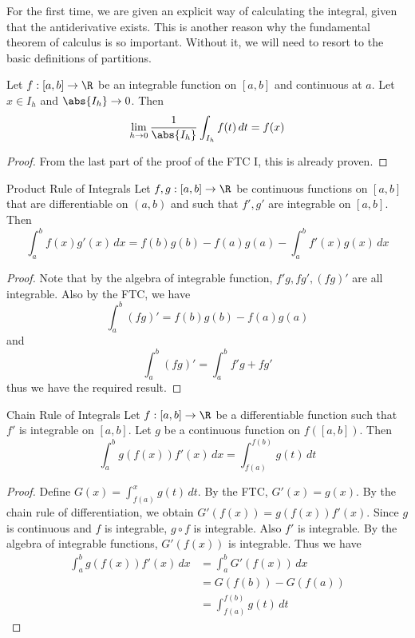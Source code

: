 For the first time, we are given an explicit way of calculating the integral, given that the antiderivative exists. This is another reason why the fundamental theorem of calculus is so important. Without it, we will need to resort to the basic definitions of partitions. 

\begin{thm}{}{} Let $f:[a,b]\to\R$ be an integrable function on $[a,b]$ and continuous at $a$. Let $x\in I_h$ and $\abs{I_h}\to 0$. Then $$\lim_{h\to 0}\frac{1}{\abs{I_h}}\int_{I_h}f(t)\,dt=f(x)$$ \tcbline
\begin{proof} From the last part of the proof of the FTC I, this is already proven. 
\end{proof}
\end{thm}

\begin{thm}{Product Rule of Integrals}{} Let $f,g:[a,b]\to\R$ be continuous functions on $[a,b]$ that are differentiable on $(a,b)$ and such that $f',g'$ are integrable on $[a,b]$. Then $$\int_{a}^{b}f(x)g'(x)\,dx=f(b)g(b)-f(a)g(a)-\int_{a}^{b}f'(x)g(x)\,dx$$ \tcbline
\begin{proof} Note that by the algebra of integrable function, $f'g,fg',(fg)'$ are all integrable. Also by the FTC, we have $$\int_a^b(fg)'=f(b)g(b)-f(a)g(a)$$ and $$\int_a^b(fg)'=\int_a^bf'g+fg'$$ thus we have the required result. 
\end{proof}
\end{thm}

\begin{thm}{Chain Rule of Integrals}{} Let $f:[a,b]\to\R$ be a differentiable function such that $f'$ is integrable on $[a,b]$. Let $g$ be a continuous function on $f([a,b])$. Then $$\int_{a}^{b}g\left(f(x)\right)f'(x)\,dx=\int_{f(a)}^{f(b)}g(t)\,dt$$ \tcbline
\begin{proof}
Define $G(x)=\int_{f(a)}^xg(t)\,dt$. By the FTC, $G'(x)=g(x)$. By the chain rule of differentiation, we obtain $G'(f(x))=g(f(x))f'(x)$. Since $g$ is continuous and $f$ is integrable, $g\circ f$ is integrable. Also $f'$ is integrable. By the algebra of integrable functions, $G'(f(x))$ is integrable. Thus we have
\begin{align*}
\int_a^bg(f(x))f'(x)\,dx&=\int_a^bG'(f(x))\,dx\\
&=G(f(b))-G(f(a))\tag{FTC}\\
&=\int_{f(a)}^{f(b)}g(t)\,dt\tag{FTC}
\end{align*}
\end{proof}
\end{thm}

